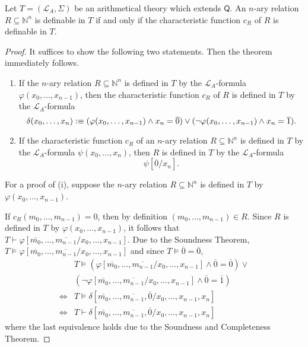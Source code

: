 \begin{lem}\label{lem:aridef}
Let $T=(\mathcal{L}_A, \Sigma)$ be an arithmetical theory which extends $\mathsf{Q}$. An $n$-ary relation $R \subseteq \mathbb{N}^n$ is definable in $T$ if and only if the characteristic function $c_R$ of $R$ is definable in $T$.
\end{lem}
\begin{proof}
It suffices to show the following two statements. Then the theorem immediately follows.
\begin{enumerate}
\item If the $n$-ary relation $R \subseteq \mathbb{N}^n$ is defined in $T$ by the $\mathcal{L}_A$-formula $\varphi(x_0, \ldots, x_{n-1})$, then the characteristic function $c_R$ of $R$ is defined in $T$ by the $\mathcal{L}_A$-formula \[\delta(x_0, \ldots, x_{n}) \vcentcolon \equiv ( \varphi(x_0, \ldots, x_{n-1}) \wedge x_{n} = \overline{0} ) \vee  ( \lnot \varphi(x_0, \ldots, x_{n-1}) \wedge x_{n}= \overline{1}) .\]
\item If the characteristic function $c_R$ of an $n$-ary relation $R\subseteq \mathbb{N}^n$ is defined in $T$ by the $\mathcal{L}_A$-formula $\psi(x_0, \ldots,x_{n})$, then $R$ is defined in $T$ by the $\mathcal{L}_A$-formula \[ \psi[\overline{0}/x_{n}]. \]  
\end{enumerate} 

For a proof of (i), suppose the $n$-ary relation $R \subseteq \mathbb{N}^n$ is defined in $T$ by $\varphi(x_0, \ldots, x_{n-1})$. 


If $c_R(m_0, \ldots, m_{n-1}) = 0$, then by definition $(m_0, \ldots, m_{n-1}) \in R$. Since $R$ is defined in $T$ by $\varphi(x_0, \ldots, x_{n-1})$, it follows that $T \vdash \varphi[\overline{m_0}, \ldots, \overline{m_{n-1}}/x_0, \ldots, x_{n-1}]$. Due to the Soundness Theorem, $T \vDash \varphi[\overline{m_0}, \ldots, \overline{m_{n-1}}/x_0, \ldots, x_{n-1}]$ and since $T \vDash \overline{0} = \overline{0}$,
\begin{align}
& T \vDash (\varphi[\overline{m_0}, \ldots, \overline{m_{n-1}}/x_0, \ldots, x_{n-1}] \wedge \overline{0} = \overline{0}) \nonumber \vee\\
 &(\lnot  \varphi[\overline{m_0}, \ldots, \overline{m_{n-1}}/x_0, \ldots, x_{n-1}] \wedge \overline{0} = \overline{1}) \nonumber \\
\Leftrightarrow & T \vDash \delta[\overline{m_0}, \ldots, \overline{m_{n-1}}, \overline{0}/x_0, \ldots, x_{n-1} ,x_n] \nonumber \\
\Leftrightarrow & T \vdash \delta[\overline{m_0}, \ldots, \overline{m_{n-1}}, \overline{0}/x_0, \ldots, x_{n-1} ,x_n]\label{eq:arithm1}
\end{align}
where the last equivalence holds due to the Soundness and Completeness Theorem.


\end{proof}
